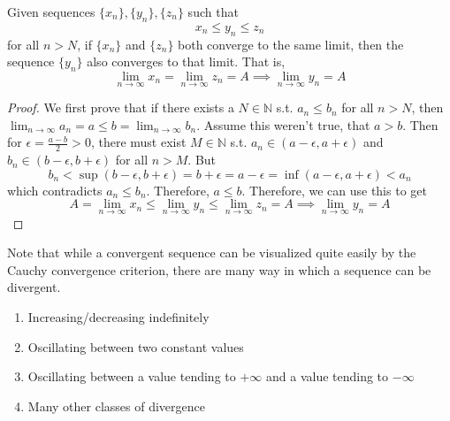     \begin{theorem}
      Given sequences $\{x_n\}, \{y_n\}, \{z_n\}$ such that 
      \[x_n \leq y_n \leq z_n\]
      for all $n > N$, if $\{x_n\}$ and $\{z_n\}$ both converge to the same limit, then the sequence $\{y_n\}$ also converges to that limit. That is, 
      \[\lim_{n \rightarrow \infty} x_n = \lim_{n \rightarrow \infty} z_n = A \implies \lim_{n \rightarrow \infty} y_n = A\]
    \end{theorem} 
    \begin{proof}
      We first prove that if there exists a $N \in \mathbb{N}$ s.t. $a_n \leq b_n$ for all $n > N$, then $\lim_{n \rightarrow \infty} a_n = a \leq b = \lim_{n \rightarrow \infty} b_n$. Assume this weren't true, that $a > b$. Then for $\epsilon = \frac{a - b}{2} > 0$, there must exist $M \in \mathbb{N}$ s.t. $a_n \in (a - \epsilon, a + \epsilon)$ and $b_n \in (b - \epsilon, b + \epsilon)$ for all $n > M$. But 
      \begin{equation}
        b_n < \sup (b - \epsilon, b + \epsilon) = b + \epsilon = a - \epsilon = \inf (a - \epsilon, a + \epsilon) < a_n
      \end{equation}
      which contradicts $a_n \leq b_n$. Therefore, $a \leq b$. Therefore, we can use this to get 
      \begin{equation}
        A = \lim_{n \rightarrow \infty} x_n \leq \lim_{n \rightarrow \infty} y_n \leq \lim_{n \rightarrow \infty} z_n = A \implies \lim_{n \rightarrow \infty} y_n = A
      \end{equation}
    \end{proof}

    Note that while a convergent sequence can be visualized quite easily by the Cauchy convergence criterion, there are many way in which a sequence can be divergent. 
    \begin{enumerate}
      \item Increasing/decreasing indefinitely
      \item Oscillating between two constant values
      \item Oscillating between a value tending to $+\infty$ and a value tending to $-\infty$
      \item Many other classes of divergence
    \end{enumerate}

